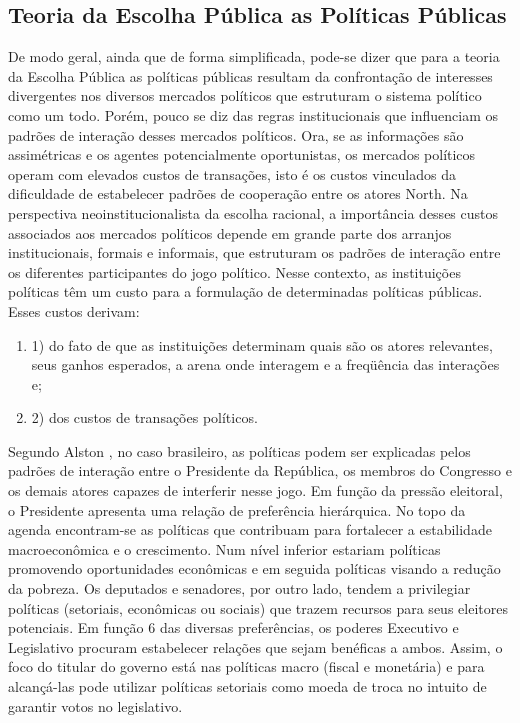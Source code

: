
\subsection{Teoria da Escolha Pública as Políticas Públicas}

De modo geral, ainda que de forma simplificada, pode-se dizer que para a teoria da Escolha Pública as políticas públicas resultam da confrontação de interesses divergentes nos diversos mercados políticos que estruturam o sistema político como um todo. Porém, pouco se diz das regras institucionais que influenciam os padrões de interação desses mercados políticos. Ora, se as informações são assimétricas e os agentes potencialmente oportunistas, os mercados políticos operam com elevados custos de transações, isto é os custos vinculados da dificuldade de estabelecer padrões de cooperação entre os atores North\cite{North1990APolitics}. Na perspectiva neoinstitucionalista da escolha racional, a importância desses custos associados aos mercados políticos depende em grande parte dos arranjos institucionais, formais e informais, que estruturam os padrões de interação entre os diferentes participantes do jogo político. Nesse contexto, as instituições políticas têm um custo para a formulação de determinadas políticas públicas. Esses custos derivam: 

\begin{enumerate}%
	\item 1) do fato de que as instituições determinam quais são os atores relevantes, seus ganhos esperados, a arena onde interagem e a freqüência das interações e;
	\item 2) dos custos de transações políticos.
\end{enumerate}%


Segundo Alston \cite{Alston2006PoliticalBrazil}, no caso brasileiro, as políticas podem ser explicadas pelos padrões de interação entre o Presidente da República, os membros do Congresso e os demais atores capazes de interferir nesse jogo. Em função da pressão eleitoral, o Presidente apresenta uma relação de preferência hierárquica. No topo da agenda encontram-se as políticas que contribuam para fortalecer a estabilidade macroeconômica e o crescimento. Num nível inferior estariam políticas promovendo oportunidades econômicas e em seguida políticas visando a redução da pobreza. Os deputados e senadores, por outro lado, tendem a privilegiar políticas (setoriais, econômicas ou sociais) que trazem recursos para seus eleitores potenciais. Em função 6 das diversas preferências, os poderes Executivo e Legislativo procuram estabelecer relações que sejam benéficas a ambos. Assim, o foco do titular do governo está nas políticas macro (fiscal e monetária) e para alcançá-las pode utilizar políticas setoriais como moeda de troca no intuito de garantir votos no legislativo. 

